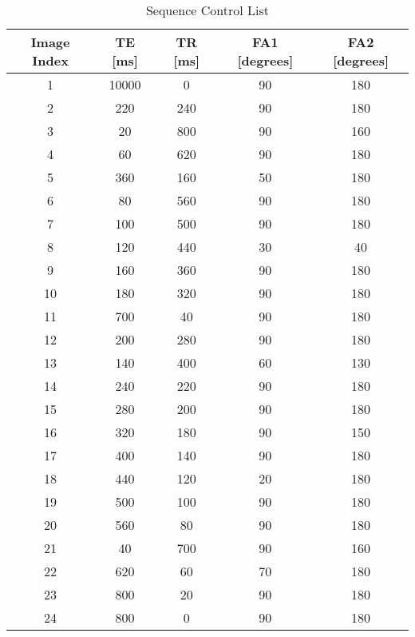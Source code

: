 \documentclass[journal]{IEEEtran}
\begin{document}
\begin{table}[ht]
\caption{Sequence Control List}
\centering
\begin{tabular}{c c c c c}
\hline\hline
Image Index & TE [ms] & TR [ms] & FA1 [degrees] & FA2 [degrees] \\ [0.5ex] %
\hline

1   &    10000      &     0     &     90   &      180\\
  2    &    220     &    240    &      90   &      180\\
   3   &     20     &    800  &        90    &     160\\
   4   &     60     &    620  &        90    &     180\\
  5    &    360    &     160 &         50   &      180\\
   6   &     80    &     560  &        90    &     180\\
    7  &    100     &    500 &         90   &      180\\
 8     &    120    &     440 &         30   &       40\\
  9    &    160   &      360 &         90   &      180\\
 10   &      180   &      320 &         90   &      180\\
    11 &     700   &       40  &        90    &     180\\
  12  &      200   &      280 &         90   &      180\\
 13   &      140   &      400 &         60   &      130\\
  14  &      240   &      220 &         90   &      180\\
   15 &      280   &      200 &         90   &      180\\
  16  &      320   &      180 &         90   &      150\\
   17 &      400   &      140 &         90   &      180\\
   18 &      440   &      120 &         20   &      180\\
   19 &      500   &      100 &         90   &      180\\
    20  &    560   &       80  &        90    &     180\\
     21  &    40    &     700  &        90    &     160\\
   22    &   620   &       60  &        70    &     180\\
     23  &   800   &       20  &        90    &     180\\
   24    &   800   &        0   &       90     &    180\\ [1ex]
\hline
\end{tabular}
\label{table:nonlin}
\end{table}
\end{document}
